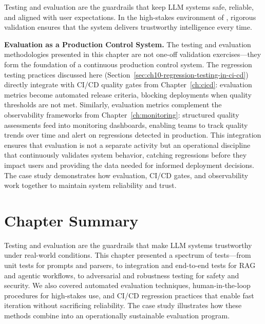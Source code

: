 Testing and evaluation are the guardrails that keep LLM systems safe, reliable, and aligned with user expectations. In the high-stakes environment of \ishtar{}, rigorous validation ensures that the system delivers trustworthy intelligence every time.

\medskip
\noindent\textbf{Evaluation as a Production Control System.} The testing and evaluation methodologies presented in this chapter are not one-off validation exercises---they form the foundation of a continuous production control system. The regression testing practices discussed here (Section~\ref{sec:ch10-regression-testing-in-ci-cd}) directly integrate with CI/CD quality gates from Chapter~\ref{ch:cicd}: evaluation metrics become automated release criteria, blocking deployments when quality thresholds are not met. Similarly, evaluation metrics complement the observability frameworks from Chapter~\ref{ch:monitoring}: structured quality assessments feed into monitoring dashboards, enabling teams to track quality trends over time and alert on regressions detected in production. This integration ensures that evaluation is not a separate activity but an operational discipline that continuously validates system behavior, catching regressions before they impact users and providing the data needed for informed deployment decisions. The \ishtar{} case study demonstrates how evaluation, CI/CD gates, and observability work together to maintain system reliability and trust.

\section*{Chapter Summary}
Testing and evaluation are the guardrails that make LLM systems trustworthy under real-world conditions.
This chapter presented a spectrum of tests---from unit tests for prompts and parsers, to integration and end-to-end tests for RAG and agentic workflows,
to adversarial and robustness testing for safety and security. We also covered automated evaluation techniques, human-in-the-loop procedures for high-stakes use,
and CI/CD regression practices that enable fast iteration without sacrificing reliability. The \ishtar{} case study illustrates how these methods combine into an
operationally sustainable evaluation program.


\printbibliography[
  heading=subbibliography,
  segment=\therefsegment,
  resetnumbers=true
]
